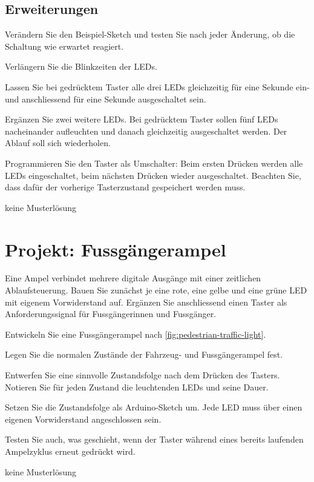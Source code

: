 \subsection{Erweiterungen}
\begin{myexercise}
Verändern Sie den Beispiel-Sketch und testen Sie nach jeder Änderung, ob die Schaltung wie erwartet reagiert.
\begin{aenum}
	\item Verlängern Sie die Blinkzeiten der LEDs.
	\item Lassen Sie bei gedrücktem Taster alle drei LEDs gleichzeitig für eine Sekunde ein- und anschliessend für eine Sekunde ausgeschaltet sein.
	\item Ergänzen Sie zwei weitere LEDs. Bei gedrücktem Taster sollen fünf LEDs nacheinander aufleuchten und danach gleichzeitig ausgeschaltet werden. Der Ablauf soll sich wiederholen.
	\item Programmieren Sie den Taster als Umschalter: Beim ersten Drücken werden alle LEDs eingeschaltet, beim nächsten Drücken wieder ausgeschaltet. Beachten Sie, dass dafür der vorherige Tasterzustand gespeichert werden muss.
\end{aenum}
\begin{myanswer}
keine Musterlösung
\end{myanswer}
\end{myexercise}

\section{Projekt: Fussgängerampel}
Eine Ampel verbindet mehrere digitale Ausgänge mit einer zeitlichen Ablaufsteuerung. Bauen Sie zunächst je eine rote, eine gelbe und eine grüne LED mit eigenem Vorwiderstand auf. Ergänzen Sie anschliessend einen Taster als Anforderungssignal für Fussgängerinnen und Fussgänger.

\begin{myexercise}
Entwickeln Sie eine Fussgängerampel nach \cref{fig:pedestrian-traffic-light}.
\begin{aenum}
	\item Legen Sie die normalen Zustände der Fahrzeug- und Fussgängerampel fest.
	\item Entwerfen Sie eine sinnvolle Zustandsfolge nach dem Drücken des Tasters. Notieren Sie für jeden Zustand die leuchtenden LEDs und seine Dauer.
	\item Setzen Sie die Zustandsfolge als Arduino-Sketch um. Jede LED muss über einen eigenen Vorwiderstand angeschlossen sein.
	\item Testen Sie auch, was geschieht, wenn der Taster während eines bereits laufenden Ampelzyklus erneut gedrückt wird.
\end{aenum}
\begin{myanswer}
keine Musterlösung
\end{myanswer}
\end{myexercise}


